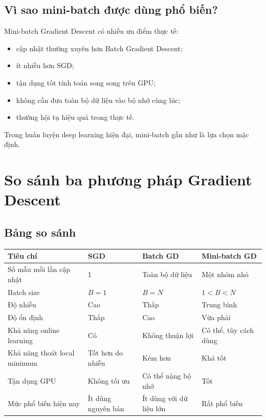 \subsection{Vì sao mini-batch được dùng phổ biến?}

Mini-batch Gradient Descent có nhiều ưu điểm thực tế:

\begin{itemize}
    \item cập nhật thường xuyên hơn Batch Gradient Descent;
    \item ít nhiễu hơn SGD;
    \item tận dụng tốt tính toán song song trên GPU;
    \item không cần đưa toàn bộ dữ liệu vào bộ nhớ cùng lúc;
    \item thường hội tụ hiệu quả trong thực tế.
\end{itemize}

\begin{ghinho}
Trong huấn luyện deep learning hiện đại, mini-batch gần như là lựa chọn mặc định.
\end{ghinho}

\section{So sánh ba phương pháp Gradient Descent}

\subsection{Bảng so sánh}

\begin{center}
\begin{tabular}{p{}p{}p{}p{}}
\toprule
Tiêu chí & SGD & Batch GD & Mini-batch GD \\
\midrule
Số mẫu mỗi lần cập nhật & 1 & Toàn bộ dữ liệu & Một nhóm nhỏ \\
Batch size & $B=1$ & $B=N$ & $1<B<N$ \\
Độ nhiễu & Cao & Thấp & Trung bình \\
Độ ổn định & Thấp & Cao & Vừa phải \\
Khả năng online learning & Có & Không thuận lợi & Có thể, tùy cách dùng \\
Khả năng thoát local minimum & Tốt hơn do nhiễu & Kém hơn & Khá tốt \\
Tận dụng GPU & Không tối ưu & Có thể nặng bộ nhớ & Tốt \\
Mức phổ biến hiện nay & Ít dùng nguyên bản & Ít dùng với dữ liệu lớn & Rất phổ biến \\
\bottomrule
\end{tabular}
\end{center}


